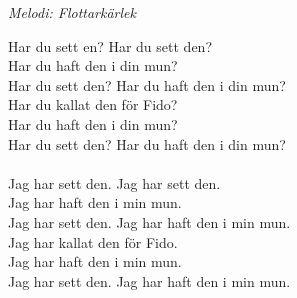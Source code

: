 {\footnotesize\textit{Melodi: Flottarkärlek}}\par
\vspace{10pt}
Har du sett en? Har du sett den?\\
Har du haft den i din mun?\\
Har du sett den? Har du haft den i din mun?\\
Har du kallat den för Fido?\\
Har du haft den i din mun?\\
Har du sett den? Har du haft den i din mun?\\
\\
Jag har sett den. Jag har sett den.\\
Jag har haft den i min mun.\\
Jag har sett den. Jag har haft den i min mun.\\
Jag har kallat den för Fido.\\
Jag har haft den i min mun.\\
Jag har sett den. Jag har haft den i min mun.
